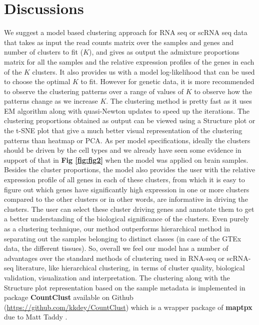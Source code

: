 \section{Discussions}

We suggest a model based clustering approach for RNA seq or scRNA seq data that takes as input the read counts matrix over the samples and genes and number of clusters to fit ($K$), and gives as output the admixture proportions matrix for all the samples and the relative expression profiles of the genes in each of the $K$ clusters. It also provides us with a model log-likelihood that can be used to choose the optimal $K$ to fit. However for genetic data, it is more recommended to observe the clustering patterns over a range of values of $K$ to observe how the patterns change as we increase $K$. The clustering method is pretty fast as it uses  EM algorithm along with quasi-Newton updates to speed up the iterations. The clustering proportions obtained as output can be viewed using a Structure plot or the t-SNE plot that give a much better visual representation of the clustering patterns than heatmap or PCA. As per model specifications, ideally the clusters should be driven by the cell types and we already have seen some evidence in support of that in \textbf{Fig \ref{fig:fig2}} when the model was applied on brain samples. Besides the cluster proportions, the model also provides the user with the relative expression profile of all genes in each of these clusters, from which it is easy to figure out which genes have significantly high expression in one or more clusters compared to the other clusters or in other words, are informative in driving the clusters. The user can select these cluster driving genes and annotate them to get a better understanding of the biological significance of the clusters.  Even purely as a clustering technique, our method  outperforms hierarchical method in separating out the samples belonging to distinct classes (in case of the GTEx data, the different tissues). So, overall we feel our model has a number of advantages over the standard methods of clustering used in RNA-seq or scRNA-seq literature, like hierarchical clustering, in terms of cluster quality, biological validation, visualization and interpretation.  The clustering along with the Structure plot representation based on the sample metadata is implemented in package \textbf{CountClust} available on Github (\href{https://github.com/kkdey/CountClust}{https://github.com/kkdey/CountClust}) which is a wrapper package of \textbf{maptpx} due to Matt Taddy \cite{Taddy2012}.  \\[3 pt]


